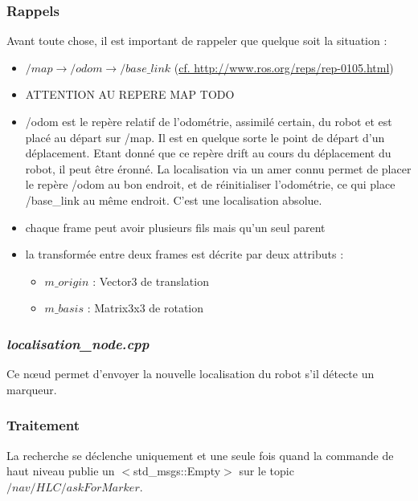 \documentclass[10pt,a4paper]{article}
\begin{document}
\subsubsection*{Rappels}
Avant toute chose, il est important de rappeler que quelque soit la situation :
\begin{itemize}
\item $/map \rightarrow /odom \rightarrow /base\_link $ (\url{cf. http://www.ros.org/reps/rep-0105.html})
\item ATTENTION AU REPERE MAP TODO
\item /odom est le repère relatif de l'odométrie, assimilé certain, du robot et est placé au départ sur /map. Il est en quelque sorte le point de départ d'un déplacement. Etant donné que ce repère drift au cours du déplacement du robot, il peut être éronné. La localisation via un amer connu permet de placer le repère /odom au bon endroit, et de réinitialiser l'odométrie, ce qui place /base\_link au même endroit. C'est une localisation absolue.
\item chaque frame peut avoir plusieurs fils mais qu'un seul parent
\item la transformée entre deux frames est décrite par deux attributs : 
  \begin{itemize}
  \item $m\_origin$ : Vector3 de translation 
  \item $m\_basis$ : Matrix3x3 de rotation
  \end{itemize}
\end{itemize}

\subsubsection{\textit{localisation\_node.cpp}}
Ce nœud permet d'envoyer la nouvelle localisation du robot s'il détecte un marqueur. 

\subsubsection*{Traitement}
\noindent La recherche se déclenche uniquement et une seule fois quand la commande de haut niveau publie un $<$std\_msgs::Empty$>$ sur le topic $/nav/HLC/askForMarker$. 
\end{document}
